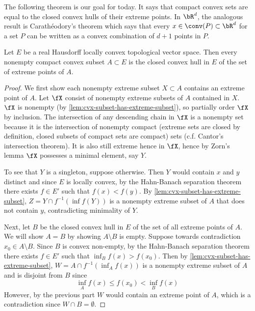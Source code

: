 The following theorem is our goal for today.
It says that compact convex sets are equal to the closed convex hulls of their
extreme points.
In $\bR^d$, the analogous result is Carath\'eodory's theorem which says
that every $x \in \conv(P) \subset \bR^d$ for a set $P$ can be written
as a convex combination of $d+1$ points in $P$.

\begin{theorem}
  \label{thm:krien-milman}
  Let $E$ be a real Hausdorff locally convex topological vector space.
  Then every nonempty compact convex subset $A \subset E$
  is the closed convex hull in $E$ of the set of extreme points of $A$.
\end{theorem}

\begin{proof}
  We first show each nonempty extreme subset $X \subset A$ contains an extreme
  point of $A$. Let $\fX$ consist of nonempty extreme subsets of $A$
  contained in $X$.
  $\fX$ is nonempty (by \cref{lem:cvx-subset-has-extreme-subset}),
  so partially order $\fX$ by inclusion.
  The intersection of any descending chain in $\fX$ is a nonempty set because
  it is the intersection of nonempty compact (extreme sets are closed by
  definition, closed subsets of compact sets are compact) sets (c.f. Cantor's
  intersection theorem). It is also still extreme hence in $\fX$,
  hence by Zorn's lemma $\fX$ possesses a minimal element, say $Y$.

  To see that $Y$ is a singleton, suppose otherwise. Then $Y$ would contain
  $x$ and $y$ distinct and since $E$ is locally convex, by the
  Hahn-Banach separation theorem there exists $f \in E'$ such that $f(x) <
  f(y)$.
  By \cref{lem:cvx-subset-has-extreme-subset}, $Z = Y \cap f^{-1}(\inf f(Y))$
  is a nonempty extreme subset of $A$ that does not contain $y$,
  contradicting minimality of $Y$.

  Next, let $B$ be the closed convex hull in $E$ of the set of all extreme
  points of $A$.
  We will show $A = B$ by showing $A \setminus B$ is empty.
  Suppose towards contradiction $x_0 \in A \setminus B$.
  Since $B$ is convex non-empty, by the Hahn-Banach separation theorem there
  exists $f \in E'$ such that $\inf_B f(x) > f(x_0)$.
  Then by \cref{lem:cvx-subset-has-extreme-subset},
  $W = A \cap f^{-1}(\inf_A f(x))$ is a nonempty extreme subset of $A$
  and is disjoint from $B$ since
  \[
    \inf_A f(x) \leq f(x_0) < \inf_B f(x)
  \]
  However, by the previous part $W$ would contain an extreme point of $A$,
  which is a contradiction since $W \cap B = \emptyset$.
\end{proof}


